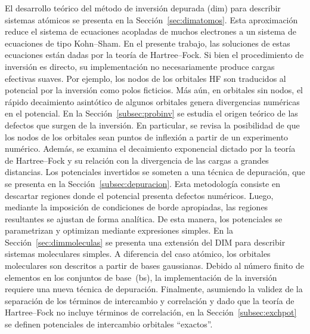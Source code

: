 El desarrollo teórico del método de inversión depurada (\acs{dim}) para 
describir sistemas atómicos se presenta en la Sección~\ref{sec:dimatomos}. 
Esta aproximación reduce el sistema de ecuaciones acopladas de muchos 
electrones a un sistema de ecuaciones de tipo Kohn--Sham. En el presente 
trabajo, las soluciones de estas ecuaciones están dadas por la teoría de 
Hartree--Fock. Si bien el procedimiento de inversión es directo, su 
implementación no necesariamente produce cargas efectivas suaves. Por 
ejemplo, los nodos de los orbitales HF son traducidos al potencial por 
la inversión como polos ficticios. Más aún, en orbitales sin nodos, el 
rápido decaimiento asintótico de algunos orbitales genera divergencias 
numéricas en el potencial. En la Sección~\ref{subsec:probinv} se estudia 
el origen teórico de las defectos que surgen de la inversión. En 
particular, se revisa la posibilidad de que los nodos de los orbitales 
sean puntos de inflexión a partir de un experimento numérico. Además, 
se examina el decaimiento exponencial dictado por la teoría de 
Hartree--Fock y su relación con la divergencia de las cargas a grandes 
distancias. Los potenciales invertidos se someten a una técnica de 
depuración, que se presenta en la Sección~\ref{subsec:depuracion}. Esta 
metodología consiste en descartar regiones donde el potencial presenta 
defectos numéricos. Luego, mediante la imposición de condiciones de 
borde apropiadas, las regiones resultantes se ajustan de forma 
analítica. De esta manera, los potenciales se parametrizan y optimizan 
mediante expresiones simples. En la Sección~\ref{sec:dimmoleculas} se 
presenta una extensión del DIM para describir sistemas moleculares 
simples. A diferencia del caso atómico, los orbitales moleculares son 
descritos a partir de bases gaussianas. Debido al número finito de 
elementos en los conjuntos de base~(\acs{bs}), la implementación de la 
inversión requiere una nueva técnica de depuración. Finalmente, 
asumiendo la validez de la separación de los términos de intercambio y 
correlación y dado que la teoría de Hartree--Fock no incluye términos de 
correlación, en la Sección~\ref{subsec:exchpot} se definen potenciales 
de intercambio orbitales ``exactos''.

